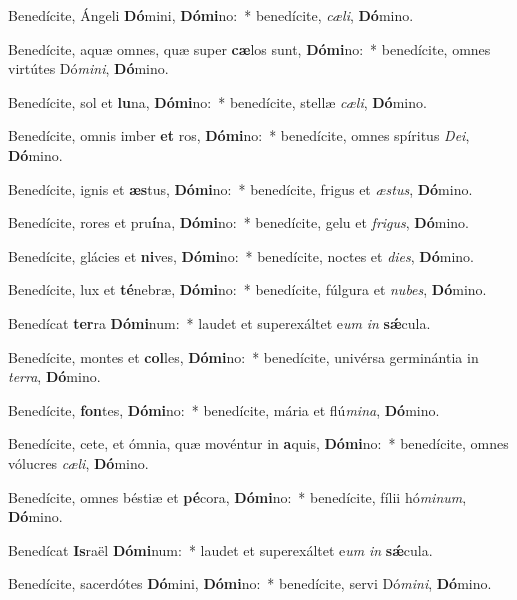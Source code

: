 \item Benedícite, Ángeli \textbf{Dó}mini, \textbf{Dó}\textbf{mi}no:~* benedícite, \textit{cæ}\textit{li}, \textbf{Dó}mino.
\item Benedícite, aquæ omnes, quæ super \textbf{cæ}los sunt, \textbf{Dó}\textbf{mi}no:~* benedícite, omnes virtútes Dó\textit{mi}\textit{ni}, \textbf{Dó}mino.
\item Benedícite, sol et \textbf{lu}na, \textbf{Dó}\textbf{mi}no:~* benedícite, stellæ \textit{cæ}\textit{li}, \textbf{Dó}mino.
\item Benedícite, omnis imber \textbf{et} ros, \textbf{Dó}\textbf{mi}no:~* benedícite, omnes spíritus \textit{De}\textit{i}, \textbf{Dó}mino.
\item Benedícite, ignis et \textbf{æs}tus, \textbf{Dó}\textbf{mi}no:~* benedícite, frigus et \textit{æs}\textit{tus}, \textbf{Dó}mino.
\item Benedícite, rores et pru\textbf{í}na, \textbf{Dó}\textbf{mi}no:~* benedícite, gelu et \textit{fri}\textit{gus}, \textbf{Dó}mino.
\item Benedícite, glácies et \textbf{ni}ves, \textbf{Dó}\textbf{mi}no:~* benedícite, noctes et \textit{di}\textit{es}, \textbf{Dó}mino.
\item Benedícite, lux et \textbf{té}nebræ, \textbf{Dó}\textbf{mi}no:~* benedícite, fúlgura et \textit{nu}\textit{bes}, \textbf{Dó}mino.
\item Benedícat \textbf{ter}ra \textbf{Dó}\textbf{mi}num:~* laudet et superexáltet e\textit{um} \textit{in} \textbf{sǽ}cula.
\item Benedícite, montes et \textbf{col}les, \textbf{Dó}\textbf{mi}no:~* benedícite, univérsa germinántia in \textit{ter}\textit{ra}, \textbf{Dó}mino.
\item Benedícite, \textbf{fon}tes, \textbf{Dó}\textbf{mi}no:~* benedícite, mária et flú\textit{mi}\textit{na}, \textbf{Dó}mino.
\item Benedícite, cete, et ómnia, quæ movéntur in \textbf{a}quis, \textbf{Dó}\textbf{mi}no:~* benedícite, omnes vólucres \textit{cæ}\textit{li}, \textbf{Dó}mino.
\item Benedícite, omnes béstiæ et \textbf{pé}cora, \textbf{Dó}\textbf{mi}no:~* benedícite, fílii hó\textit{mi}\textit{num}, \textbf{Dó}mino.
\item Benedícat \textbf{Is}raël \textbf{Dó}\textbf{mi}num:~* laudet et superexáltet e\textit{um} \textit{in} \textbf{sǽ}cula.
\item Benedícite, sacerdótes \textbf{Dó}mini, \textbf{Dó}\textbf{mi}no:~* benedícite, servi Dó\textit{mi}\textit{ni}, \textbf{Dó}mino.
